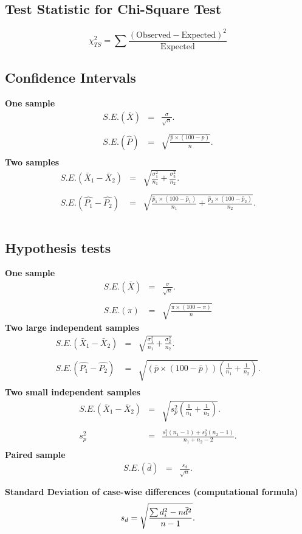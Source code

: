 \documentclass[a4paper,12pt]{article}
\begin{document}
\subsection*{Test Statistic for Chi-Square Test}
{
\Large
\[ \chi^2_{TS} = \sum \frac{(\mbox{Observed} -\mbox{Expected} )^2}{\mbox{Expected} }\]
}


\subsection*{Confidence Intervals}
{\bf One sample}
\begin{eqnarray*} S.E.(\bar{X})&=&\frac{\sigma}{\sqrt{n}}.\\\\
S.E.(\hat{P})&=&\sqrt{\frac{\hat{p}\times(100-\hat{p})}{n}}.\\
\end{eqnarray*}
{\bf Two samples}
\begin{eqnarray*}
S.E.(\bar{X}_1-\bar{X}_2)&=&\sqrt{\frac{\sigma^2_1}{n_1}+\frac{\sigma_2^2}{n_2}}.\\\\
S.E.(\hat{P_1}-\hat{P_2})&=&\sqrt{\frac{\hat{p}_1\times(100-\hat{p}_1)}{n_1}+\frac{\hat{p}_2\times(100-\hat{p}_2)}{n_2}}.\\\\
\end{eqnarray*}
\subsection*{Hypothesis tests}
{\bf One sample}
\begin{eqnarray*}
S.E.(\bar{X})&=&\frac{\sigma}{\sqrt{n}}.\\\\
S.E.(\pi)&=&\sqrt{\frac{\pi\times(100-\pi)}{n}}
\end{eqnarray*}
{\bf Two large independent samples}
\begin{eqnarray*}
S.E.(\bar{X}_1-\bar{X}_2)&=&\sqrt{\frac{\sigma^2_1}{n_1}+\frac{\sigma_2^2}{n_2}}.\\\\
S.E.(\hat{P_1}-\hat{P_2})&=&\sqrt{\left(\bar{p}\times(100-\bar{p})\right)\left(\frac{1}{n_1}+\frac{1}{n_2}\right)}.\\
\end{eqnarray*}
{\bf Two small independent samples}
\begin{eqnarray*}
S.E.(\bar{X}_1-\bar{X}_2)&=&\sqrt{s_p^2\left(\frac{1}{n_1}+\frac{1}{n_2}\right)}.\\\\
s_p^2&=&\frac{s_1^2(n_1-1)+s_2^2(n_2-1)}{n_1+n_2-2}.\\
\end{eqnarray*}
{\bf Paired sample}
\begin{eqnarray*}
S.E.(\bar{d})&=&\frac{s_d}{\sqrt{n}}.\\\\
\end{eqnarray*}
{\bf Standard Deviation of case-wise differences (computational formula)}
\begin{eqnarray*}
s_d = \sqrt{ {\sum d_i^2 - n\bar{d}^2 \over n-1}}.\\\\
\end{eqnarray*}
\end{document}
